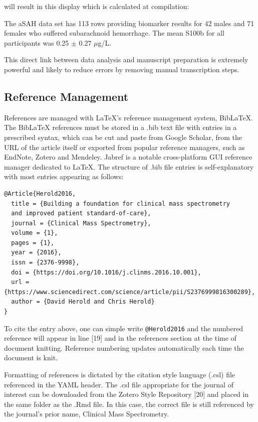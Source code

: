 \documentclass[]{elsarticle} %
\begin{document}
\vspace{12pt}

\noindent will result in this display which is calculated at
compilation:

\vspace{12pt}

\noindent The aSAH data set has 113 rows providing biomarker results for
42 males and 71 females who suffered subarachnoid hemorrhage. The mean
S100b for all participants was 0.25 \(\pm\) 0.27 \(\mu\)g/L.

\vspace{12pt}

This direct link between data analysis and manuscript preparation is
extremely powerful and likely to reduce errors by removing manual
transcription steps.

\hypertarget{reference-management}{%
\subsection{Reference Management}\label{reference-management}}

References are managed with LaTeX's reference management system,
BibLaTeX. The BibLaTeX references must be stored in a .bib text file
with entries in a prescribed syntax, which can be cut and paste from
Google Scholar, from the URL of the article itself or exported from
popular reference managers, such as EndNote, Zotero and Mendeley. Jabref
is a notable cross-platform GUI reference manager dedicated to LaTeX.
The structure of .bib file entries is self-explanatory with most entries
appearing as follows:

\begin{verbatim}
@Article{Herold2016,
  title = {Building a foundation for clinical mass spectrometry
  and improved patient standard-of-care},
  journal = {Clinical Mass Spectrometry},
  volume = {1},
  pages = {1},
  year = {2016},
  issn = {2376-9998},
  doi = {https://doi.org/10.1016/j.clinms.2016.10.001},
  url = {https://www.sciencedirect.com/science/article/pii/S2376999816300289},
  author = {David Herold and Chris Herold}
}
\end{verbatim}

To cite the entry above, one can simple write \texttt{@Herold2016} and
the numbered reference will appear in line {[}19{]} and in the
references section at the time of document knitting. Reference numbering
updates automatically each time the document is knit.

Formatting of references is dictated by the citation style language
(.csl) file referenced in the YAML header. The .csl file appropriate for
the journal of interest can be downloaded from the Zotero Style
Repository {[}20{]} and placed in the same folder as the .Rmd file. In
this case, the correct file is still referenced by the journal's prior
name, Clinical Mass Spectrometry.
\end{document}
